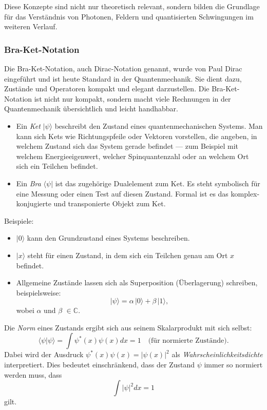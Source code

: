 Diese Konzepte sind nicht nur theoretisch relevant, sondern bilden die Grundlage für das Verständnis von Photonen, Feldern und quantisierten Schwingungen im weiteren Verlauf.

\subsubsection{Bra-Ket-Notation\label{fourier:subsubsection:braKetNotation}}
Die Bra-Ket-Notation, auch Dirac-Notation genannt, wurde von Paul Dirac eingeführt und ist heute Standard in der Quantenmechanik.
%
%
%
Sie dient dazu, Zustände und Operatoren kompakt und elegant darzustellen.
Die Bra-Ket-Notation ist nicht nur kompakt, sondern macht viele Rechnungen in der Quantenmechanik übersichtlich und leicht handhabbar.

\begin{itemize}
	\item Ein \emph{Ket} $|\psi\rangle$ beschreibt den Zustand eines quantenmechanischen Systems.
%
	Man kann sich Kets wie Richtungspfeile oder Vektoren vorstellen, die angeben, in welchem Zustand sich das System gerade befindet ---
	zum Beispiel mit welchem Energieeigenwert, welcher Spinquantenzahl oder an welchem Ort sich ein Teilchen befindet.
	\item Ein \emph{Bra} $\langle\psi|$ ist das zugehörige Dualelement zum Ket.
%
	Es steht symbolisch für eine Messung oder einen Test auf diesen Zustand.
	Formal ist es das komplex-konjugierte und transponierte Objekt zum Ket.
\end{itemize}
Beispiele:
\begin{itemize}
\item $|0\rangle$ kann den Grundzustand eines Systems beschreiben.
\item $|x\rangle$ steht für einen Zustand, in dem sich ein Teilchen genau am Ort $x$ befindet.
\item Allgemeine Zustände lassen sich als Superposition (Überlagerung) schreiben, beispielsweise:
%
\[
	|\psi\rangle = \alpha\,|0\rangle + \beta\,|1\rangle,
\]
wobei $\alpha$ und $\beta$ $\in \mathbb{C}$.
\end{itemize}

Die \emph{Norm} eines Zustands ergibt sich aus seinem Skalarprodukt mit sich selbst:
\begin{equation}\label{fourier:equation:normEinesZustands}
	\langle \psi | \psi \rangle = \int \psi^*(x)\psi(x)dx = 1 \quad \text{(für normierte Zustände)}.
\end{equation}
Dabei wird der Ausdruck $\psi^*(x)\psi(x) = |\psi(x)|^2$ als \emph{Wahrscheinlichkeitsdichte} interpretiert.
%
Dies bedeutet einschränkend, dass der Zustand $\psi$ immer so normiert werden muss, dass
\begin{equation}
	\int |\psi|^2 dx = 1
\end{equation}
gilt.

